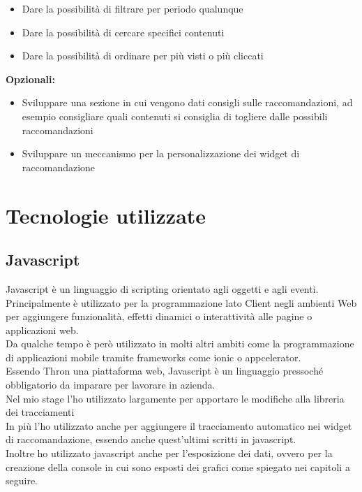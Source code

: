 \documentclass[a4paper, 12pt, twoside, openright]{book}
\begin{document}
\begin{itemize}
	\item Dare la possibilità di filtrare per periodo qualunque
	\item Dare la possibilità di cercare specifici contenuti
	\item Dare la possibilità di ordinare per più visti o più cliccati
\end{itemize}
\textbf{Opzionali:}
\begin{itemize}
	\item Sviluppare una sezione in cui vengono dati consigli sulle raccomandazioni, ad esempio consigliare quali contenuti si consiglia di togliere dalle possibili raccomandazioni
	\item Sviluppare un meccanismo per la personalizzazione dei widget di raccomandazione
\end{itemize}

\newpage{}
\section{Tecnologie utilizzate}

\subsection{Javascript}
Javascript è un linguaggio di scripting orientato agli oggetti e agli eventi. Principalmente è utilizzato per la programmazione lato Client negli ambienti Web per aggiungere funzionalità, effetti dinamici o interattività alle pagine o applicazioni web.\\
Da qualche tempo è però utilizzato in molti altri ambiti come la programmazione di applicazioni mobile tramite frameworks come ionic o appcelerator.\\
Essendo Thron una piattaforma web, Javascript è un linguaggio pressoché obbligatorio da imparare per lavorare in azienda.\\
Nel mio stage l'ho utilizzato largamente per apportare le modifiche alla libreria dei tracciamenti\\ 
In più l'ho utilizzato anche per aggiungere il tracciamento automatico nei widget di raccomandazione, essendo anche quest'ultimi scritti in javascript.\\
Inoltre ho utilizzato javascript anche per l'esposizione dei dati, ovvero per la creazione della console in cui sono esposti dei grafici come spiegato nei capitoli a seguire.\\ \\
\end{document}
